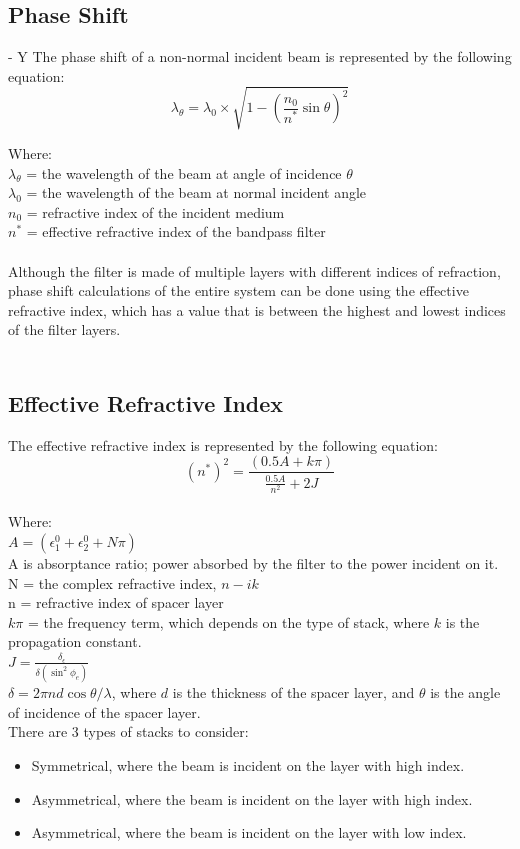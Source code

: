 \subsection{Phase Shift} - Y
The phase shift of a non-normal incident beam is represented by the following equation:
\\
\begin{equation}
    \lambda_\theta = \lambda_0 \times \sqrt{1 - \left( \frac{n_0}{n^*} \sin\theta \right)^2}
\end{equation}

Where:
\\
$\lambda_\theta$ = the wavelength of the beam at angle of incidence $\theta$
\\
$\lambda_0$ = the wavelength of the beam at normal incident angle
\\
$n_0$ = refractive index of the incident medium 
\\
$n^*$ = effective refractive index of the bandpass filter 
\\\\
Although the filter is made of multiple layers with different indices of refraction, phase shift calculations of the entire system can be done using the effective refractive index, which has a value that is between the highest and lowest indices of the filter layers. 
\\\\
\subsection{Effective Refractive Index}
The effective refractive index is represented by the following equation:
\\
\begin{equation}
    (n^*)^2 = \frac{(0.5A +k\pi)}{\frac{0.5A}{n^2} +2J}
\end{equation}
\\
Where:
\\
$A = (\epsilon_1^0 +\epsilon_2^0 + N\pi)$
\\
A is absorptance ratio; power absorbed by the filter to the power incident on it. 
\\
N = the complex refractive index, $n-ik$
\\
n = refractive index of spacer layer
\\
$k\pi$ = the frequency term, which depends on the type of stack, where $k$ is the propagation constant. 
\\
$J = \frac{\delta_\epsilon}{\delta(\sin^2\phi_e)}$
\\
$\delta = 2\pi n d \cos \theta / \lambda$, where $d$ is the thickness of the spacer layer, and $\theta$ is the angle of incidence of the spacer layer.
\\
There are 3 types of stacks to consider:
\begin{itemize}
    \item Symmetrical, where the beam is incident on the layer with high index.
    \item Asymmetrical, where the beam is incident on the layer with high index.
    \item Asymmetrical, where the beam is incident on the layer with low index.
\end{itemize}

